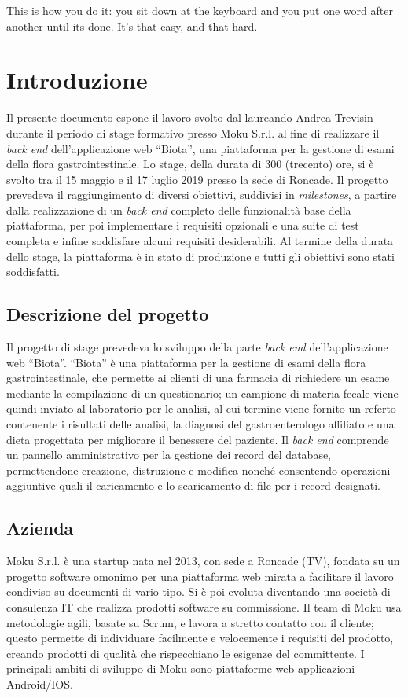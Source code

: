 \begin{savequote}[75mm]
    This is how you do it: you sit down at the keyboard and you put one word after another until its done. It's that easy, and that hard.
    \end{savequote}    
\chapter{Introduzione}
\label{introduction}
Il presente documento espone il lavoro svolto dal laureando Andrea Trevisin durante il periodo di stage formativo presso Moku S.r.l. al fine di realizzare il \textit{back end} dell'applicazione web ``Biota'', una piattaforma per la gestione di esami della flora gastrointestinale.
Lo stage, della durata di 300 (trecento) ore, si è svolto tra il 15 maggio e il 17 luglio 2019 presso la sede di Roncade. Il progetto prevedeva il raggiungimento di diversi obiettivi, suddivisi in \textit{milestones}, a partire dalla realizzazione di un \textit{back end} completo delle funzionalità base della piattaforma, per poi implementare i requisiti opzionali e una suite di test completa e infine soddisfare alcuni requisiti desiderabili.
Al termine della durata dello stage, la piattaforma è in stato di produzione e tutti gli obiettivi sono stati soddisfatti.

\section{Descrizione del progetto}
Il progetto di stage prevedeva lo sviluppo della parte \textit{back end} dell'applicazione web ``Biota''. ``Biota'' è una piattaforma per la gestione di esami della flora gastrointestinale, che permette ai clienti di una farmacia di richiedere un esame mediante la compilazione di un questionario; un campione di materia fecale viene quindi inviato al laboratorio per le analisi, al cui termine viene fornito un referto contenente i risultati delle analisi, la diagnosi del gastroenterologo affiliato e una dieta progettata per migliorare il benessere del paziente. Il \textit{back end} comprende un pannello amministrativo per la gestione dei record del database, permettendone creazione, distruzione e modifica nonché consentendo operazioni aggiuntive quali il caricamento e lo scaricamento di file per i record designati.

\section{Azienda}
Moku S.r.l. è una startup nata nel 2013, con sede a Roncade (TV), fondata su un progetto software omonimo per una piattaforma web mirata a facilitare il lavoro condiviso su documenti di vario tipo. Si è poi evoluta diventando una società di consulenza IT che realizza prodotti software su commissione. 
Il team di Moku usa metodologie agili, basate su Scrum, e lavora a stretto contatto con il cliente; questo permette di individuare facilmente e velocemente i requisiti del prodotto, creando prodotti di qualità che rispecchiano le esigenze del committente. I principali ambiti di sviluppo di Moku sono piattaforme web applicazioni Android/IOS.

